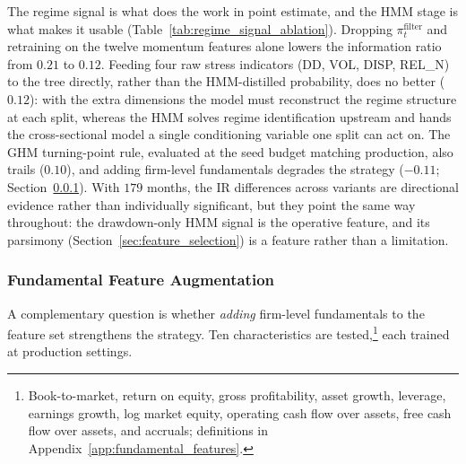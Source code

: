 The regime signal is what does the work in point estimate, and the HMM stage is what makes it usable (Table~\ref{tab:regime_signal_ablation}). Dropping $\pi_t^{\text{filter}}$ and retraining on the twelve momentum features alone lowers the information ratio from $0.21$ to $0.12$. Feeding four raw stress indicators (DD, VOL, DISP, REL\_N) to the tree directly, rather than the HMM-distilled probability, does no better ($0.12$): with the extra dimensions the model must reconstruct the regime structure at each split, whereas the HMM solves regime identification upstream and hands the cross-sectional model a single conditioning variable one split can act on. The GHM turning-point rule, evaluated at the seed budget matching production, also trails ($0.10$), and adding firm-level fundamentals degrades the strategy ($-0.11$; Section~\ref{sec:fund_ablation}). With $179$ months, the IR differences across variants are directional evidence rather than individually significant, but they point the same way throughout: the drawdown-only HMM signal is the operative feature, and its parsimony (Section~\ref{sec:feature_selection}) is a feature rather than a limitation.



\subsubsection{Fundamental Feature Augmentation}\label{sec:fund_ablation}

A complementary question is whether \emph{adding} firm-level fundamentals to the feature set strengthens the strategy. Ten characteristics are tested,\footnote{Book-to-market, return on equity, gross profitability, asset growth, leverage, earnings growth, log market equity, operating cash flow over assets, free cash flow over assets, and accruals; definitions in Appendix~\ref{app:fundamental_features}.} each trained at production settings.



